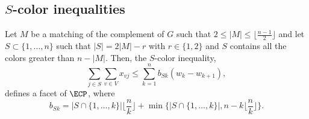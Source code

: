 \subsection{$S$-color inequalities}

\begin{tthm} \label{TONLYCOLORS}
Let $M$ be a matching of the complement of $G$ such that $2 \leq |M| \leq \lfloor \frac{n-1}{2} \rfloor$
and let $S \subset \{1,\ldots,n\}$ such that $|S| = 2|M| - r$ with $r \in \{1,2\}$ and $S$ contains all the colors
greater than $n - |M|$. Then, the $S$-color inequality, \ie
\begin{equation} \label{RONLYCOLORSAGAIN}
\sum_{j \in S} \sum_{v \in V} x_{vj} \leq \sum_{k=1}^{n} b_{Sk} (w_k - w_{k+1}),
\end{equation}
defines a facet of $\ECP$, where
$$b_{Sk} = |S \cap \{1,\ldots,k\}| \biggl\lfloor \dfrac{n}{k} \biggr\rfloor + \min \biggl\{ |S \cap \{1,\ldots,k\}|, n - k \biggl\lfloor \dfrac{n}{k} \biggr\rfloor \biggr\}.$$
\end{tthm}
